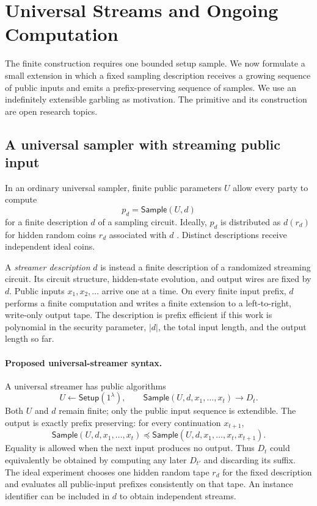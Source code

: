 \section{Universal Streams and Ongoing Computation}
\label{sec:ongoing}

The finite construction requires one bounded setup sample. We now formulate a
small extension in which a fixed sampling description receives a growing
sequence of public inputs and emits a prefix-preserving sequence of samples.
We use an indefinitely extensible garbling as motivation. The primitive and
its construction are open research topics.

\subsection{A universal sampler with streaming public input}

In an ordinary universal sampler, finite public parameters $U$ allow every
party to compute
\[
  p_d=\mathsf{Sample}(U,d)
\]
for a finite description $d$ of a sampling circuit. Ideally, $p_d$ is
distributed as $d(r_d)$ for hidden random coins $r_d$ associated with $d$
\cite{HofheinzEtAl2014UniversalSamplers}. Distinct descriptions receive
independent ideal coins.

A \emph{streamer description} $d$ is instead a finite description of a
randomized streaming circuit. Its circuit structure, hidden-state evolution,
and output wires are fixed by $d$. Public inputs $x_1,x_2,\ldots$ arrive one
at a time. On every finite input prefix, $d$ performs a finite computation and
writes a finite extension to a left-to-right, write-only output tape. The
description is prefix efficient if this work is polynomial in the security
parameter, $|d|$, the total input length, and the output length so far.

\paragraph{Proposed universal-streamer syntax.}
A universal streamer has public algorithms
\[
  U\leftarrow\mathsf{Setup}(1^\lambda),
  \qquad
  \mathsf{Sample}(U,d,x_1,\ldots,x_t)\longrightarrow D_t.
\]
Both $U$ and $d$ remain finite; only the public input sequence is extendible.
The output is exactly prefix preserving: for every continuation $x_{t+1}$,
\[
  \mathsf{Sample}(U,d,x_1,\ldots,x_t)
  \preceq
  \mathsf{Sample}(U,d,x_1,\ldots,x_t,x_{t+1}).
\]
Equality is allowed when the next input produces no output. Thus $D_t$ could
equivalently be obtained by computing any later $D_{t'}$ and discarding its
suffix. The ideal experiment chooses one hidden random tape $r_d$ for the
fixed description and evaluates all public-input prefixes consistently on
that tape. An instance identifier can be included in $d$ to obtain independent
streams.

